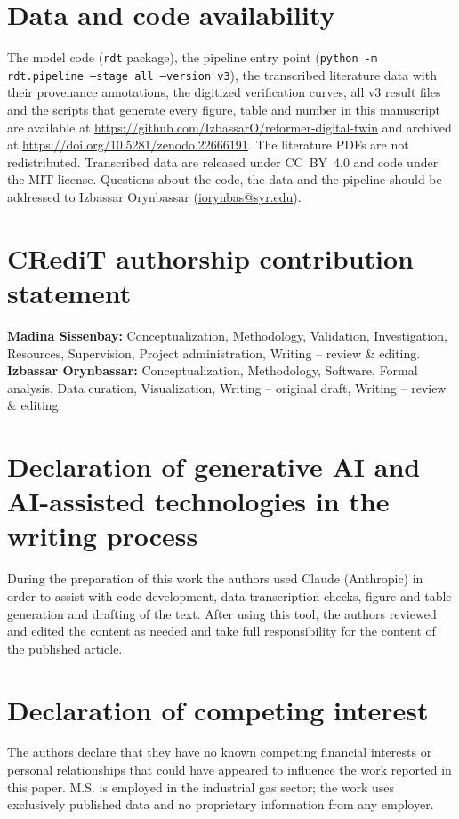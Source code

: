\documentclass[final,3p,times]{elsarticle}
\begin{document}
\section*{Data and code availability}
The model code (\texttt{rdt} package), the pipeline entry point (\texttt{python -m rdt.pipeline --stage all --version v3}), the transcribed literature data with their provenance annotations, the digitized verification curves, all v3 result files and the scripts that generate every figure, table and number in this manuscript are available at \url{https://github.com/IzbassarO/reformer-digital-twin} and archived at \url{https://doi.org/10.5281/zenodo.22666191}. The literature PDFs are not redistributed. Transcribed data are released under CC~BY~4.0 and code under the MIT license. Questions about the code, the data and the pipeline should be addressed to Izbassar Orynbassar (\href{mailto:iorynbas@syr.edu}{iorynbas@syr.edu}).

\section*{CRediT authorship contribution statement}
\textbf{Madina Sissenbay:} Conceptualization, Methodology, Validation, Investigation, Resources, Supervision, Project administration, Writing -- review \& editing.
\textbf{Izbassar Orynbassar:} Conceptualization, Methodology, Software, Formal analysis, Data curation, Visualization, Writing -- original draft, Writing -- review \& editing.

\section*{Declaration of generative AI and AI-assisted technologies in the writing process}
During the preparation of this work the authors used Claude (Anthropic) in order to assist with code development, data transcription checks, figure and table generation and drafting of the text. After using this tool, the authors reviewed and edited the content as needed and take full responsibility for the content of the published article.

\section*{Declaration of competing interest}
The authors declare that they have no known competing financial interests or personal relationships that could have appeared to influence the work reported in this paper. M.S. is employed in the industrial gas sector; the work uses exclusively published data and no proprietary information from any employer.
\end{document}
